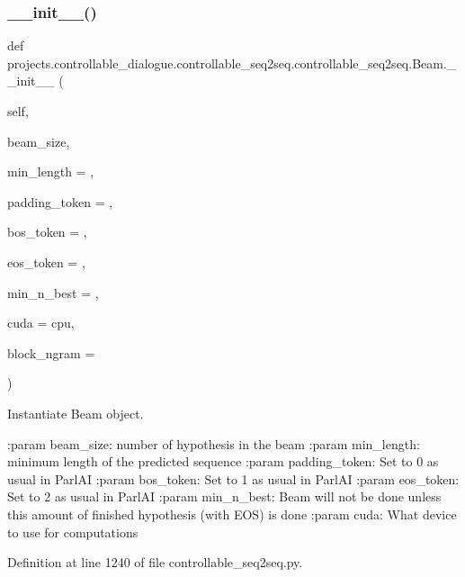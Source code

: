 \subsubsection{\texorpdfstring{\+\_\+\+\_\+init\+\_\+\+\_\+()}{\_\_init\_\_()}}
{\footnotesize\ttfamily def projects.\+controllable\+\_\+dialogue.\+controllable\+\_\+seq2seq.\+controllable\+\_\+seq2seq.\+Beam.\+\_\+\+\_\+init\+\_\+\+\_\+ (\begin{DoxyParamCaption}\item[{}]{self,  }\item[{}]{beam\+\_\+size,  }\item[{}]{min\+\_\+length = {},  }\item[{}]{padding\+\_\+token = {},  }\item[{}]{bos\+\_\+token = {},  }\item[{}]{eos\+\_\+token = {},  }\item[{}]{min\+\_\+n\+\_\+best = {},  }\item[{}]{cuda = {\ttfamily \textquotesingle{}cpu\textquotesingle{}},  }\item[{}]{block\+\_\+ngram = {} }\end{DoxyParamCaption})}

\begin{DoxyVerb}Instantiate Beam object.

:param beam_size:
    number of hypothesis in the beam
:param min_length:
    minimum length of the predicted sequence
:param padding_token:
    Set to 0 as usual in ParlAI
:param bos_token:
    Set to 1 as usual in ParlAI
:param eos_token:
    Set to 2 as usual in ParlAI
:param min_n_best:
    Beam will not be done unless this amount of finished hypothesis
    (with EOS) is done
:param cuda:
    What device to use for computations
\end{DoxyVerb}
 

Definition at line 1240 of file controllable\+\_\+seq2seq.\+py.


